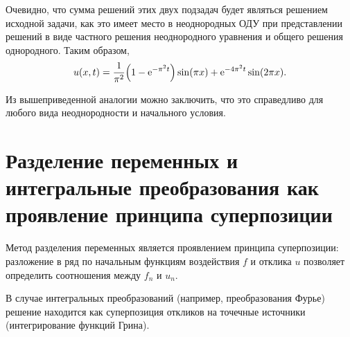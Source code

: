 Очевидно, что сумма решений этих двух подзадач будет являться решением исходной
задачи, как это имеет место в неоднородных ОДУ при представлении решений в виде
частного решения неоднородного уравнения и общего решения однородного. Таким
образом,
\[
    u(x, t) = \frac{1}{\pi^2}\Bigl(1 - \mathrm{e}^{-\pi^2 t}\Bigr)\sin(\pi x) +
    \mathrm{e}^{-4\pi^2 t}\sin(2\pi x).
\]

Из вышеприведенной аналогии можно заключить, что это справедливо для любого вида
неоднородности и начального условия.

\section{Разделение переменных и интегральные преобразования как проявление
принципа суперпозиции}

Метод разделения переменных является проявлением принципа суперпозиции:
разложение в ряд по начальным функциям воздействия \( f \) и отклика \( u \)
позволяет определить соотношения между \( f_n \) и \( u_n \).

В случае интегральных преобразований (например, преобразования Фурье) решение
находится как суперпозиция откликов на точечные источники (интегрирование
функций Грина).

\newpage
